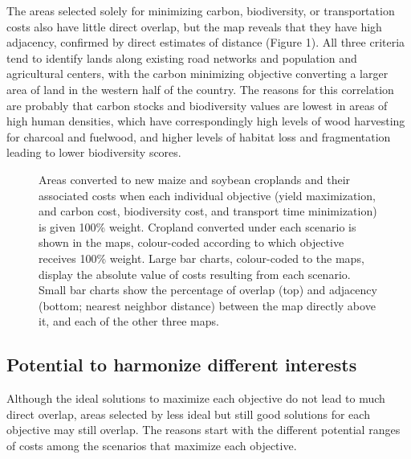 \documentclass[a4paper]{article}
\begin{document}
{The areas selected solely for minimizing carbon, biodiversity, or transportation costs also have little direct overlap, but the map reveals that they have high adjacency, confirmed by direct estimates of distance (Figure 1). All three criteria tend to identify lands along existing road networks and population and agricultural centers, with the carbon minimizing objective converting a larger area of land in the western half of the country. The reasons for this correlation are probably that carbon stocks and biodiversity values are lowest in areas of high human densities, which have correspondingly high levels of wood harvesting for charcoal and fuelwood, and higher levels of habitat loss and fragmentation leading to lower biodiversity scores.  

\begin{figure}[!ht]
  \begin{center}
    \caption{Areas converted to new maize and soybean croplands and their associated costs when each individual objective (yield maximization, and carbon cost, biodiversity cost, and transport time minimization) is given 100\% weight. Cropland converted under each scenario is shown in the maps, colour-coded according to which objective receives 100\% weight. Large bar charts, colour-coded to the maps, display the absolute value of costs resulting from each scenario. Small bar charts show the percentage of overlap (top) and adjacency (bottom; nearest neighbor distance) between the map directly above it, and each of the other three maps.}
    \label{default}
  \end{center}
\end{figure}
 
\subsection*{Potential to harmonize different interests}

Although the ideal solutions to maximize each objective do not lead to much direct overlap, areas selected by less ideal but still good solutions for each objective may still overlap.  The reasons start with the different potential ranges of costs among the scenarios that maximize each objective.

}
\end{document}
